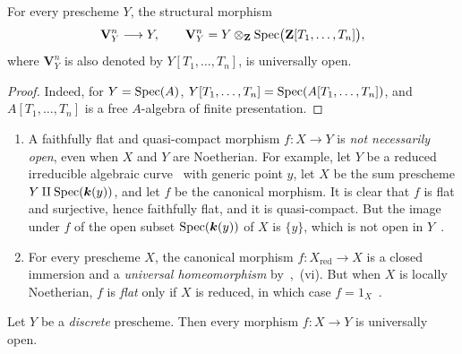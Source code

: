 \begin{corollary}[2.4.7]
\label{IV.2.4.7}
For every prescheme $Y$, the structural morphism
\[
  \mathbf{V}_Y^n\longrightarrow Y,
  \qquad
  \mathbf{V}_Y^n
  =Y\otimes_{\mathbf{Z}}\operatorname{Spec}\bigl(\mathbf{Z}[T_1,\ldots,T_n]\bigr),
\]
\textup{where $\mathbf{V}_Y^n$ is also denoted by $Y[T_1,\ldots,T_n]$}, is universally open.
\end{corollary}

\begin{proof}
Indeed, for $Y=\operatorname{Spec}(A)$, $Y[T_1,\ldots,T_n]=\operatorname{Spec}(A[T_1,\ldots,T_n])$, and $A[T_1,\ldots,T_n]$ is a free $A$-algebra of finite presentation.
\end{proof}

\begin{remarks}[2.4.8]
\label{IV.2.4.8}
\medskip\noindent
\begin{enumerate}
  \item[(i)] A faithfully flat and quasi-compact morphism $f:X\to Y$ is \emph{not necessarily open}, even when $X$ and $Y$ are Noetherian.
    For example, let $Y$ be a reduced irreducible algebraic curve~ with generic point $y$, let $X$ be the sum prescheme $Y\amalg\operatorname{Spec}(\boldsymbol{k}(y))$, and let $f$ be the canonical morphism. It is clear that $f$ is flat and surjective, hence faithfully flat, and it is quasi-compact. But the image under $f$ of the open subset $\operatorname{Spec}(\boldsymbol{k}(y))$ of $X$ is $\{y\}$, which is not open in $Y$~.
  \item[(ii)] For every prescheme $X$, the canonical morphism $f:X_{\mathrm{red}}\to X$ is a closed immersion and a \emph{universal homeomorphism} by~,~(vi). But when $X$ is locally Noetherian, $f$ is \emph{flat} only if $X$ is reduced, in which case $f=1_X$~.
\end{enumerate}
\end{remarks}

\begin{proposition}[2.4.9]
\label{IV.2.4.9}
Let $Y$ be a \emph{discrete} prescheme. Then every morphism $f:X\to Y$ is universally open.
\end{proposition}


